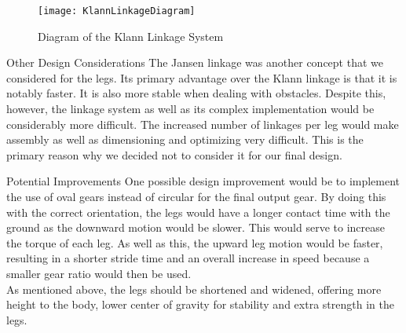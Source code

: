 \begin{homeworkProblem}
\begin{figure}[H]
  \begin{center}
    \texttt{[image: KlannLinkageDiagram]}
    \caption{Diagram of the Klann Linkage System}
    \label{klannLinkage1}
  \end{center}
\end{figure}

\begin{homeworkSection}{Other Design Considerations}
The Jansen linkage was another concept that we considered for the legs. Its primary advantage over the Klann linkage is that it is notably faster. It is also more stable when dealing with obstacles. Despite this, however, the linkage system as well as its complex implementation would be considerably more difficult. The increased number of linkages per leg would make assembly as well as dimensioning and optimizing very difficult. This is the primary reason why we decided not to consider it for our final design.
\end{homeworkSection}

\begin{homeworkSection}{Potential Improvements}
One possible design improvement would be to implement the use of oval gears instead of circular for the final output gear. By doing this with the correct orientation, the legs would have a longer contact time with the ground as the downward motion would be slower. This would serve to increase the torque of each leg. As well as this, the upward leg motion would be faster, resulting in a shorter stride time and an overall increase in speed because a smaller gear ratio would then be used.\\

As mentioned above, the legs should be shortened and widened, offering more height to the body, lower center of gravity for stability and extra strength in the legs.
\end{homeworkSection}
\end{homeworkProblem}

